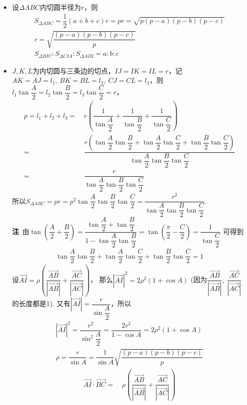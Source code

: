 \begin{itemize}[leftmargin=\inteval{\myitemleftmargin}pt,itemsep=
   \inteval{\myitemitempsep}pt,topsep=\inteval{\myitemtopsep}pt]
\item 设$ \Delta ABC $内切圆半径为$ r $，则
\begin{gather*}
    S_{\Delta ABC}=\dfrac{1}{2}(a+b+c)r=pr=\sqrt{p(p-a)(p-b)(p-c)} \\
    r=\sqrt{\dfrac{(p-a)(p-b)(p-c)}{p}} \\
    S_{\Delta BIC}:S_{\Delta CIA}:S_{\Delta AIB}=a:b:c
\end{gather*}
\item $ J,K,L $为内切圆与三条边的切点，$ IJ=IK=IL=r $，记$ AK=AJ=l_1,\ 
BK=BL=l_2,\ CJ=CL=l_3 $，则
$ l_1\tan\dfrac{A}{2}=l_2\tan\dfrac{B}{2}=l_3\tan\dfrac{C}{2}=r $，
\begin{align*}
    p=l_1+l_2+l_3=&\ r\left(\dfrac{1}{\tan\dfrac{A}{2}}
    +\dfrac{1}{\tan\dfrac{B}{2}}+\dfrac{1}{\tan\dfrac{C}{2}} \right) \\
    =&\ \dfrac{r\left(\tan\dfrac{A}{2}\tan\dfrac{B}{2}+
        \tan\dfrac{A}{2}\tan\dfrac{C}{2}+\tan\dfrac{B}{2}\tan\dfrac{C}{2}
        \right)}{\tan\dfrac{A}{2}\tan\dfrac{B}{2}\tan\dfrac{C}{2}} \\
    =&\ \dfrac{r}{\tan\dfrac{A}{2}\tan\dfrac{B}{2}\tan\dfrac{C}{2}}
\end{align*}
所以$ S_{\Delta ABC}=pr=p^2\tan\dfrac{A}{2}\tan\dfrac{B}{2}\tan\dfrac{C}{2}=
\dfrac{r^2}{\tan\dfrac{A}{2}\tan\dfrac{B}{2}\tan\dfrac{C}{2}} $. \\
\textbf{注}\ 由$ \tan\left(\dfrac{A}{2}+\dfrac{B}{2}\right)=
\dfrac{\tan \dfrac{A}{2}+\tan \dfrac{B}{2}}
{1-\tan \dfrac{A}{2}\tan \dfrac{B}{2}}=
\tan\left(\dfrac{\pi}{2}-\dfrac{C}{2}\right)=
\dfrac{1}{\tan \dfrac{C}{2}} $
可得到
\begin{gather*}
    \tan\dfrac{A}{2}\tan\dfrac{B}{2}+\tan\dfrac{A}{2}
    \tan\dfrac{C}{2}+\tan\dfrac{B}{2}\tan\dfrac{C}{2}=1
\end{gather*}
设$ \vec{AI}=\rho\left(\dfrac{\vec{AB}}{|
    \vec{AB}|}+\dfrac{\vec{AC}}{|\vec{AC}|}\right) $，
    那么$ |\vec{AI}|^2=2\rho^2(1+\cos A) $
    (因为$\dfrac{\vec{AB}}{|\vec{AB}|},\ \dfrac{\vec{AC}}{|\vec{AC}|}$
    的长度都是1). 又有$ |\vec{AI}|=\dfrac{r}{\sin \dfrac{A}{2}} $，所以
\begin{gather*}
    |\vec{AI}|^2=\dfrac{r^2}{\sin^2 \dfrac{A}{2}}=
    \dfrac{2r^2}{1-\cos A}= 2\rho^2(1+\cos A) \\
    \rho=\dfrac{r}{\sin A}=\dfrac{1}{\sin A}\sqrt{\dfrac{(p-a)(p-b)(p-c)}{p}} 
\end{gather*}
\begin{align*}
    \vec{AI}\cdot\vec{BC}=&\ \rho\left(\dfrac{
        \vec{AB}}{|\vec{AB}|}+\dfrac{\vec{AC}}{|\vec{AC}|}\right)

\end{align*}
\end{itemize}
